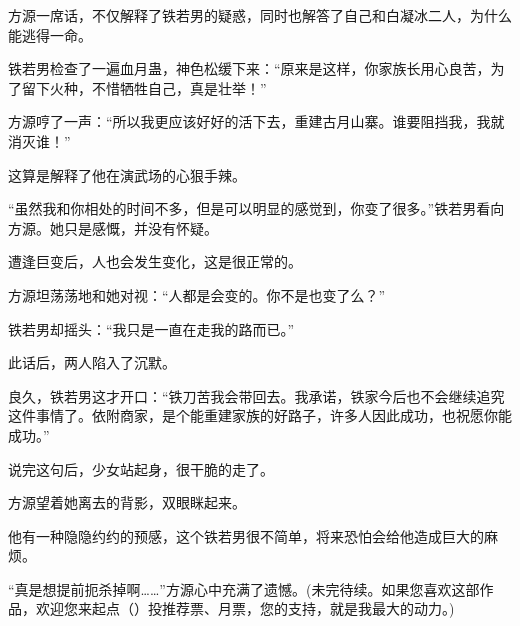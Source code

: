 \begin{this_body}
方源一席话，不仅解释了铁若男的疑惑，同时也解答了自己和白凝冰二人，为什么能逃得一命。

铁若男检查了一遍血月蛊，神色松缓下来：“原来是这样，你家族长用心良苦，为了留下火种，不惜牺牲自己，真是壮举！”

方源哼了一声：“所以我更应该好好的活下去，重建古月山寨。谁要阻挡我，我就消灭谁！”

这算是解释了他在演武场的心狠手辣。

“虽然我和你相处的时间不多，但是可以明显的感觉到，你变了很多。”铁若男看向方源。她只是感慨，并没有怀疑。

遭逢巨变后，人也会发生变化，这是很正常的。

方源坦荡荡地和她对视：“人都是会变的。你不是也变了么？”

铁若男却摇头：“我只是一直在走我的路而已。”

此话后，两人陷入了沉默。

良久，铁若男这才开口：“铁刀苦我会带回去。我承诺，铁家今后也不会继续追究这件事情了。依附商家，是个能重建家族的好路子，许多人因此成功，也祝愿你能成功。”

说完这句后，少女站起身，很干脆的走了。

方源望着她离去的背影，双眼眯起来。

他有一种隐隐约约的预感，这个铁若男很不简单，将来恐怕会给他造成巨大的麻烦。

“真是想提前扼杀掉啊……”方源心中充满了遗憾。(未完待续。如果您喜欢这部作品，欢迎您来起点（）投推荐票、月票，您的支持，就是我最大的动力。)

\end{this_body}

